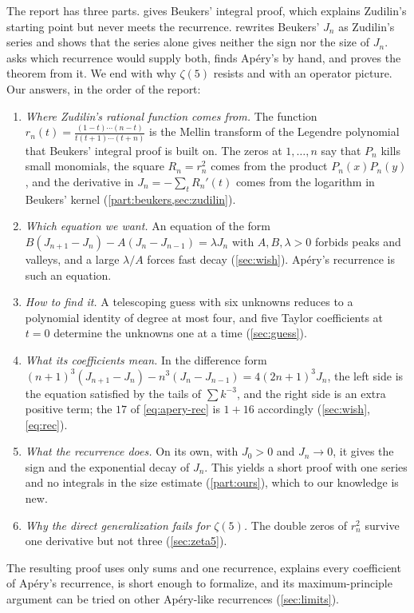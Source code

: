 \documentclass[11pt]{article}
\theoremstyle{plain}
\theoremstyle{definition}
\theoremstyle{remark}
\begin{document}
The report has three parts.  gives Beukers' integral proof, which explains
Zudilin's starting point but never meets the recurrence.  rewrites Beukers' $J_n$ as
Zudilin's series and shows that the series alone gives neither the sign nor the size of $J_n$.
 asks which recurrence would supply both, finds Ap\'ery's by hand, and proves the
theorem from it. We end with why $\zeta(5)$ resists and with an operator picture. Our answers, in
the order of the report:
\begin{enumerate}
  \item \emph{Where Zudilin's rational function comes from.} The function
    $r_n(t)=\frac{(1-t)\cdots(n-t)}{t(t+1)\cdots(t+n)}$ is the Mellin transform of the
    Legendre polynomial that Beukers' integral proof is built on. The zeros at $1,\dots,n$ say that
    $P_n$ kills small monomials, the square $R_n=r_n^2$ comes from the product $P_n(x)P_n(y)$, and
    the derivative in $J_n=-\sum_tR_n'(t)$ comes from the logarithm in Beukers' kernel
    (\cref{part:beukers,sec:zudilin}).
  \item \emph{Which equation we want.} An equation of the form
    $B(J_{n+1}-J_n)-A(J_n-J_{n-1})=\lambda J_n$ with $A,B,\lambda>0$ forbids peaks and valleys,
    and a large $\lambda/A$ forces fast decay (\cref{sec:wish}). Ap\'ery's recurrence is such an equation.
  \item \emph{How to find it.} A telescoping guess with six unknowns reduces to a polynomial identity of
    degree at most four, and five Taylor coefficients at $t=0$ determine the unknowns one at a time
    (\cref{sec:guess}).
  \item \emph{What its coefficients mean.} In the difference form
    $(n+1)^3(J_{n+1}-J_n)-n^3(J_n-J_{n-1})=4(2n+1)^3J_n$, the left side is the equation satisfied
    by the tails of $\sum k^{-3}$, and the right side is an extra positive term; the $17$ of
    \eqref{eq:apery-rec} is $1+16$ accordingly (\cref{sec:wish}, \eqref{eq:rec}).
  \item \emph{What the recurrence does.} On its own, with $J_0>0$ and $J_n\to0$, it gives the sign and
    the exponential decay of $J_n$. This yields a short proof with one series and no integrals in
    the size estimate (\cref{part:ours}), which to our knowledge is new.
  \item \emph{Why the direct generalization fails for $\zeta(5)$.} The double zeros of $r_n^2$ survive
    one derivative but not three (\cref{sec:zeta5}).
\end{enumerate}
The resulting proof uses only sums and one recurrence, explains every coefficient
of Ap\'ery's recurrence, is short enough to formalize, and its maximum-principle argument can be
tried on other Ap\'ery-like recurrences (\cref{sec:limits}).
\end{document}
